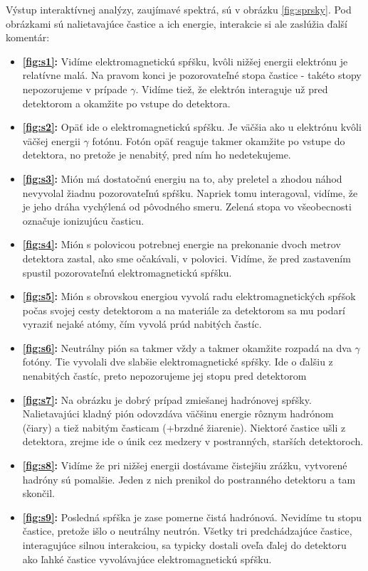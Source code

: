 \documentclass[a4paper, 10pt]{article}
\begin{document}
Výstup interaktívnej analýzy, zaujímavé spektrá, sú v obrázku \ref{fig:sprsky}. Pod obrázkami sú nalietavajúce častice a ich energie, interakcie si ale zaslúžia ďalší komentár:
\begin{itemize}
\item \textbf{\ref{fig:s1}:} Vidíme elektromagnetickú spŕšku, kvôli nižšej energii elektrónu je relatívne malá. Na pravom konci je pozorovateľné stopa častice - takéto stopy nepozorujeme v prípade $\gamma$. Vidíme tiež, že elektrón interaguje už pred detektorom a okamžite po vstupe do detektora.
\item \textbf{\ref{fig:s2}:} Opäť ide o elektromagnetickú spŕšku. Je väčšia ako u elektrónu kvôli väčšej energii $\gamma$ fotónu. Fotón opäť reaguje takmer okamžite po vstupe do detektora, no pretože je nenabitý, pred ním ho nedetekujeme.
\item \textbf{\ref{fig:s3}:} Mión má dostatočnú energiu na to, aby preletel a zhodou náhod nevyvolal žiadnu pozorovateľnú spŕšku. Napriek tomu interagoval, vidíme, že  je jeho dráha vychýlená od pôvodného smeru. Zelená stopa vo všeobecnosti označuje ionizujúcu časticu.
\item \textbf{\ref{fig:s4}:} Mión s polovicou potrebnej energie na prekonanie dvoch metrov detektora zastal, ako sme očakávali, v polovici. Vidíme, že pred zastavením spustil pozorovateľnú elektromagnetickú spŕšku.
\item \textbf{\ref{fig:s5}:} Mión s obrovskou energiou vyvolá radu elektromagnetických spŕšok počas svojej cesty detektorom a na materiále za detektorom sa mu podarí vyraziť nejaké atómy, čím vyvolá prúd nabitých častíc.
\item \textbf{\ref{fig:s6}:} Neutrálny pión sa takmer vždy a takmer okamžite rozpadá na dva $\gamma$ fotóny. Tie vyvolali dve slabšie elektromagnetické spŕšky. Ide o ďalšiu z nenabitých častíc, preto nepozorujeme jej stopu pred detektorom
\item \textbf{\ref{fig:s7}:} Na obrázku je dobrý prípad zmiešanej hadrónovej spŕšky. Nalietavajúci kladný pión odovzdáva väčšinu energie rôznym hadrónom (čiary) a tiež nabitým časticam (+brzdné žiarenie). Niektoré častice ušli z detektora, zrejme ide o únik cez medzery v postranných, starších detektoroch.
\item \textbf{\ref{fig:s8}:} Vidíme že pri nižšej energii dostávame čistejšiu zrážku, vytvorené hadróny sú pomalšie. Jeden z nich prenikol do postranného detektoru a tam skončil.
\item \textbf{\ref{fig:s9}:} Posledná spŕška je zase pomerne čistá hadrónová. Nevidíme tu stopu častice, pretože išlo o neutrálny neutrón. Všetky tri predchádzajúce častice, interagujúce silnou interakciou, sa typicky dostali oveľa ďalej do detektoru ako ľahké častice vyvolávajúce elektromagnetickú spŕšku.
\end{itemize}
\end{document}

